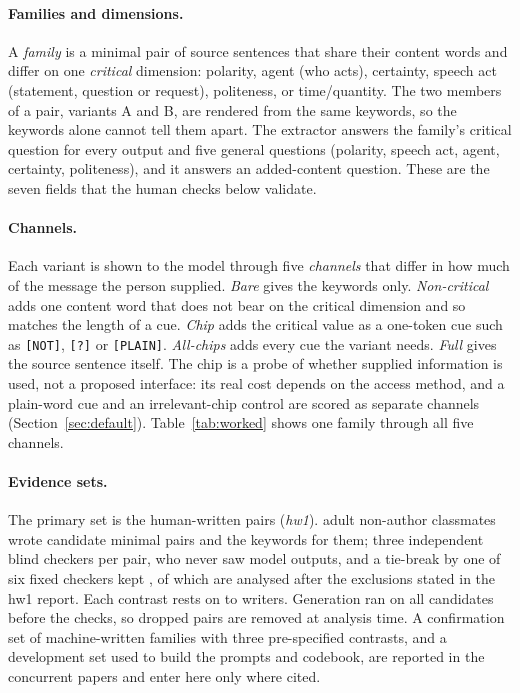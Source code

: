 \paragraph{Families and dimensions.}
A \emph{family} is a minimal pair of source sentences that share their content words and differ on one \emph{critical} dimension: polarity, agent (who acts), certainty, speech act (statement, question or request), politeness, or time/quantity.
The two members of a pair, variants A and B, are rendered from the same keywords, so the keywords alone cannot tell them apart.
The extractor answers the family's critical question for every output and five general questions (polarity, speech act, agent, certainty, politeness), and it answers an added-content question.
These are the seven fields that the human checks below validate.

\paragraph{Channels.}
Each variant is shown to the model through five \emph{channels} that differ in how much of the message the person supplied.
\emph{Bare} gives the keywords only.
\emph{Non-critical} adds one content word that does not bear on the critical dimension and so matches the length of a cue.
\emph{Chip} adds the critical value as a one-token cue such as \texttt{[NOT]}, \texttt{[?]} or \texttt{[PLAIN]}.
\emph{All-chips} adds every cue the variant needs.
\emph{Full} gives the source sentence itself.
The chip is a probe of whether supplied information is used, not a proposed interface: its real cost depends on the access method, and a plain-word cue and an irrelevant-chip control are scored as separate channels (Section~\ref{sec:default}).
Table~\ref{tab:worked} shows one family through all five channels.

\paragraph{Evidence sets.}
The primary set is the human-written pairs (\emph{hw1}).
\jmhwWritersKept{} adult non-author classmates wrote \jmhwCand{} candidate minimal pairs and the keywords for them; three independent blind checkers per pair, who never saw model outputs, and a tie-break by one of six fixed checkers kept \jmhwKept{}, of which \jmhwFamilies{} are analysed after the exclusions stated in the hw1 report.
Each contrast rests on \jmhwWrMin{} to \jmhwWrMax{} writers.
Generation ran on all candidates before the checks, so dropped pairs are removed at analysis time.
A confirmation set of machine-written families with three pre-specified contrasts, and a development set used to build the prompts and codebook, are reported in the concurrent papers and enter here only where cited.

